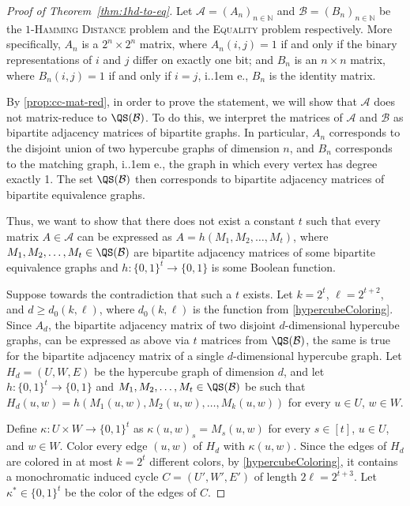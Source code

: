 \documentclass{theoretics}
\makeatletter
\newcommand{\zo}{\{0,1\}}
\newcommand{\cA}{\ensuremath{\mathcal{A}}}
\newcommand{\cB}{\ensuremath{\mathcal{B}}}
\newcommand{\bN}{\ensuremath{\mathbb{N}}}
\newcommand*\ie{i.\kern.1em e.\@\xspace} %
\makeatother
\begin{document}
\begin{proof}[Proof of Theorem~\ref{thm:1hd-to-eq}]
	Let  $\cA=(A_n)_{n \in \bN}$ 
	and $\cB=(B_n)_{n \in \bN}$ be the \textsc{$1$-Hamming Distance} problem and the \textsc{Equality} problem respectively. 
	More specifically, $A_n$ is a $2^n \times 2^n$ matrix, where $A_n(i,j) = 1$ if and only if the binary representations of $i$ and $j$ differ on exactly one bit; and $B_n$ is an $n \times n$ matrix, where $B_n(i,j) = 1$ if and only if $i = j$, \ie, $B_n$ is the identity matrix.
	
	By \cref{prop:cc-mat-red}, in order to prove the statement, we will show that 
	$\cA$ does not matrix-reduce to $\QS(\cB)$.
	To do this, we interpret the matrices of $\cA$ and $\cB$ as bipartite adjacency matrices of bipartite graphs.
	In particular, $A_n$ corresponds to the disjoint union of two hypercube graphs of dimension $n$,
	and $B_n$ corresponds to the matching graph, \ie, the graph in which every vertex has degree exactly 1.
	The set $\QS(\cB)$ then corresponds to bipartite adjacency matrices of bipartite equivalence graphs.
	
	Thus, we want to show that there does not exist a constant $t$ such that
	every matrix $A \in \cA$ can be expressed as $A = h(M_1, M_2, \ldots, M_t)$, where $M_1, M_2, \ldots, M_t \in \QS(\cB)$ are bipartite adjacency matrices of some bipartite equivalence graphs and $h: \zo^t \rightarrow \zo$ is some Boolean function.

	Suppose towards the contradiction that such a $t$ exists. 
	Let $k = 2^t$, $\ell = 2^{t+2}$, and $d \geq d_0(k, \ell)$, where $d_0(k, \ell)$ is the function from \cref{hypercubeColoring}. 
	Since $A_d$, the bipartite adjacency matrix of two disjoint $d$-dimensional hypercube graphs, can be expressed as above via $t$ matrices from $\QS(\cB)$, the same is true for the bipartite adjacency matrix of a single $d$-dimensional hypercube graph.
	Let $H_d = (U,W,E)$ be the hypercube graph of dimension $d$, and let 
	$h: \zo^t \rightarrow \zo$ and $M_1, M_2, \ldots, M_t \in \QS(\cB)$ be such that $H_d(u,w) = h(M_1(u,w), M_2(u,w), \ldots, M_k(u,w))$ for every $u \in U$, $w \in W$.
	 
	Define $\kappa: U \times W \rightarrow \{0,1\}^t$ as $\kappa(u,w)_s = M_s(u,w)$
	for every $s \in [t]$, $u \in U$, and $w \in W$.
	Color every edge $(u,w)$ of $H_d$ with $\kappa(u,w)$.
	Since the edges of $H_d$ are colored in at most $k = 2^t$ different colors,
	by \cref{hypercubeColoring}, it contains a monochromatic 
	induced cycle $C = (U', W', E')$ of length $2 \ell = 2^{t+3}$.
	Let $\kappa^* \in \{0,1\}^t$ be the color of the edges of $C$.
	

\end{proof}
\end{document}
